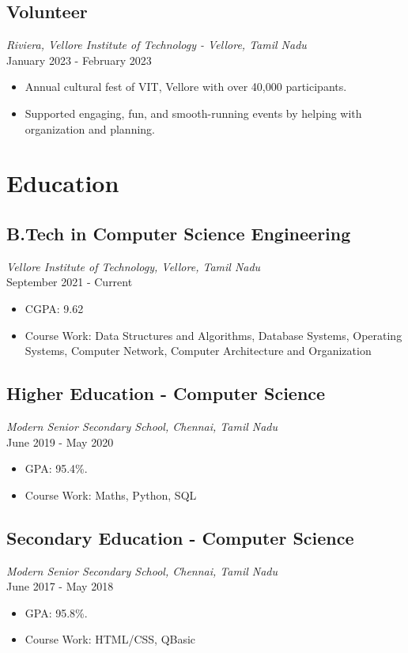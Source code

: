 \documentclass[a4paper,10pt]{article}
\begin{document}
\subsection*{\large\textbf{Volunteer}}
\textit{Riviera, Vellore Institute of Technology - Vellore, Tamil Nadu} \\
January 2023 - February 2023
\begin{itemize}
    \item Annual cultural fest of VIT, Vellore with over 40,000 participants.
    \item Supported engaging, fun, and smooth-running events by helping with organization and planning.
\end{itemize}

\vspace{10pt}

\section*{Education}
\subsection*{\large\textbf{B.Tech in Computer Science Engineering}}
\textit{Vellore Institute of Technology, Vellore, Tamil Nadu} \\
September 2021 - Current
\begin{itemize}
    \item CGPA: 9.62
    \item Course Work: Data Structures and Algorithms, Database Systems, Operating Systems, Computer Network, Computer Architecture and Organization
\end{itemize}

\subsection*{\large\textbf{Higher Education - Computer Science}}
\textit{Modern Senior Secondary School, Chennai, Tamil Nadu} \\
June 2019 - May 2020
\begin{itemize}
    \item GPA: 95.4\%.
    \item Course Work: Maths, Python, SQL
\end{itemize}

\subsection*{\large\textbf{Secondary Education - Computer Science}}
\textit{Modern Senior Secondary School, Chennai, Tamil Nadu} \\
June 2017 - May 2018
\begin{itemize}
    \item GPA: 95.8\%.
    \item Course Work: HTML/CSS, QBasic
\end{itemize}
\end{document}
